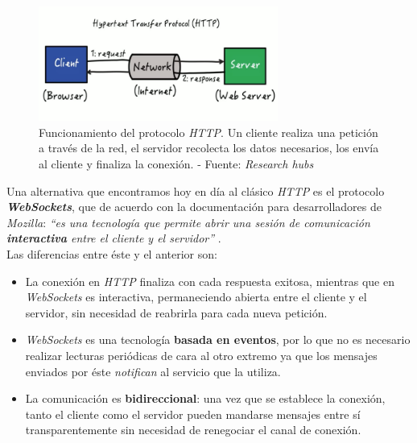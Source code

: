 \begin{figure}[h]
	\centering
	\includegraphics[width=0.7\textwidth]{imagenes/http.png}
	\caption{Funcionamiento del protocolo \textit{HTTP}. Un cliente realiza una petición a través de la red, el servidor recolecta los datos necesarios, los envía al cliente y finaliza la conexión. - Fuente: \textit{Research hubs} \cite{http-image}}
\end{figure}

Una alternativa que encontramos hoy en día al clásico \textit{HTTP} es el protocolo \textbf{\textit{WebSockets}}, que de acuerdo con la documentación para desarrolladores de \textit{Mozilla}: \textit{``es una tecnología que permite abrir una sesión de comunicación \textbf{interactiva} entre el cliente y el servidor''} \cite{ws_protocol}.\\

Las diferencias entre éste y el anterior son:

\begin{itemize}
	\item La conexión en \textit{HTTP} finaliza con cada respuesta exitosa, mientras que en \textit{WebSockets} es interactiva, permaneciendo abierta entre el cliente y el servidor, sin necesidad de reabrirla para cada nueva petición.
	\item \textit{WebSockets} es una tecnología \textbf{basada en eventos}, por lo que no es necesario realizar lecturas periódicas de cara al otro extremo ya que los mensajes enviados por éste \textit{notifican} al servicio que la utiliza.
	\item La comunicación es \textbf{bidireccional}: una vez que se establece la conexión, tanto el cliente como el servidor pueden mandarse mensajes entre sí transparentemente sin necesidad de renegociar el canal de conexión.
\end{itemize}

